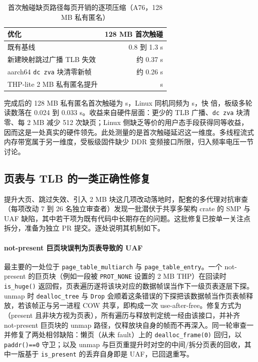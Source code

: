 \begin{table}[H]\centering\small
\begin{tabular}{@{}p{8.2cm}r@{}}
\toprule
优化 & 128 MB 首次触碰 \\
\midrule
既有基线 & 0.8 到 1.3 s \\
新建映射跳过广播 TLB 失效 & 约 0.37 s \\
aarch64 \texttt{dc zva} 块清零新帧 & 约 0.26 s \\
THP-lite 2 MB 私有匿名提升 & \nThpFT{} s \\
\bottomrule
\end{tabular}
\caption{首次触碰缺页路径每页开销的逐项压缩（A76，128 MB 私有匿名）}
\end{table}

完成后的 128 MB 私有匿名首次触碰为 \nThpFT{} s，Linux 同机同频为 \nThpFTLin{} s，快 \nThpRatio{} 倍，板级多轮读数落在 0.024 到 0.033 s。收益来自硬件层面：更少的 TLB 广播、\texttt{dc zva} 块清零、每 2 MB 减少 512 次缺页；Linux 侧缺乏等价的用户态手段获得同等收益，因而这是一处真实的硬件领先。此处测量的是首次触碰延迟这一维度。多线程流式内存带宽属于另一维度，受板级固件缺少 DDR 变频接口所限，归入频率电压一节讨论。


\subsection{页表与 TLB 的一类正确性修复}

提升大页、跳过失效、引入 2 MB 块这几项改动落地时，配套的多代理对抗审查（每项改动 7 到 26 名独立审查者）发现一批潜伏于共享多架构 crate 的 SMP 与 UAF 缺陷，其中若干项为既有代码中长期存在的问题。这批修复已按单一关注点拆分，准备为独立 PR 提交。逐处说明其机制如下。

\paragraph{not-present 巨页块误判为页表导致的 UAF}
最主要的一处位于 \texttt{page\_table\_multiarch} 与 \texttt{page\_table\_entry}。一个 not-present 的巨页块（例如一段被 \texttt{PROT\_NONE} 设置的 2 MB THP）在回读时 \texttt{is\_huge()} 返回假，页表遍历遂将该块对应的数据帧误当作下一级页表逐层下探。unmap 时 \texttt{dealloc\_tree} 与 \texttt{Drop} 会顺着这条错误的下探把该数据帧当作页表帧释放，若该帧正与另一进程 COW 共享，即构成一次 use-after-free。修复方式为（present 且非块方视为页表），所有遍历与释放判定统一经由该接口，并补齐 not-present 巨页块的 unmap 路径，仅释放块自身的帧而不再深入。同一轮审查一并修复了两处相邻缺陷：懒页（从未 fault）上的 \texttt{dealloc\_frame(0)} 回归，以 \texttt{paddr()==0} 守卫；以及 unmap 与巨页重提升时对空的中间/拆分页表的回收，其中一版基于 \texttt{is\_present} 的丢弃自身即是 UAF，已回退重写。

